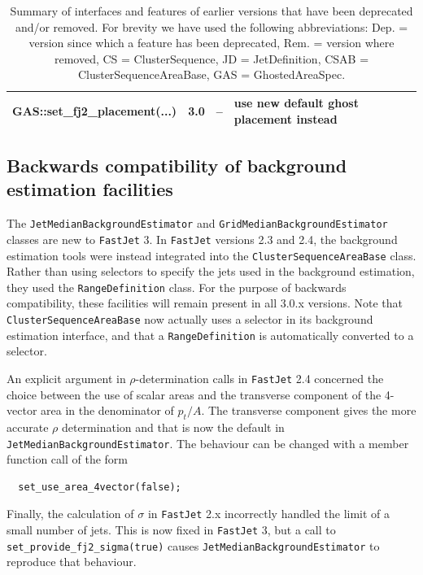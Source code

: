 \documentclass[12pt,a4]{article}
\newcommand{\fastjet}{\texttt{FastJet}\xspace}
\newcommand{\ttt}[1]{{\small\texttt{#1}}}
\begin{document}
\begin{table}
\begin{tabular}{lccl}
    GAS::set\_fj2\_placement(...)
                   & 3.0    & --   & use new default ghost placement instead\\
    \bottomrule %
  \end{tabular}
  \caption{Summary of interfaces and features of earlier versions that have been
    deprecated and/or removed. For brevity we have used the following
    abbreviations: Dep. = version since which a feature has been
    deprecated, Rem. = version where removed, CS
    = ClusterSequence, JD = JetDefinition, CSAB = ClusterSequenceAreaBase, GAS =
    GhostedAreaSpec.
    \label{tab:deprecated}
  } 
\end{table}

\subsection{Backwards compatibility of background estimation facilities}
\label{sec:BGE-backwards}

The \ttt{JetMedianBackgroundEstimator} and
\ttt{GridMedianBackgroundEstimator} classes are new to \fastjet 3.
%
In \fastjet versions 2.3 and 2.4, the background estimation tools were
instead integrated into the \ttt{ClusterSequenceAreaBase} class.
%
Rather than using selectors to specify the jets used in the background
estimation, they used the \ttt{RangeDefinition} class.
%
For the purpose of backwards compatibility, these facilities will
remain present in all 3.0.x versions.
%
Note that \ttt{ClusterSequenceAreaBase} now actually uses a selector
in its background estimation interface, and that a
\ttt{RangeDefinition} is automatically converted to a selector.

An explicit argument in $\rho$-determination calls in \fastjet 2.4
concerned the choice between the use of scalar areas and the
transverse component of the 4-vector area in the denominator of
$p_t/A$.
%
The transverse component gives the more accurate $\rho$ determination
and that is now the default in \ttt{JetMedianBackgroundEstimator}. 
%
The behaviour can be changed with a member function call of the form 
\begin{lstlisting}
  set_use_area_4vector(false);
\end{lstlisting}
%
Finally, the calculation of $\sigma$ in \fastjet 2.x incorrectly
handled the limit of a small number of jets. This is now fixed in \fastjet 3, but 
a call to
\ttt{set\_provide\_fj2\_sigma(true)} causes \ttt{JetMedianBackgroundEstimator}
to reproduce that behaviour.
\end{document}
